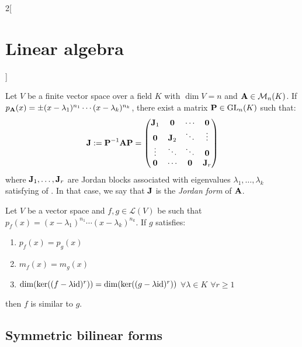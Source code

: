\documentclass[../../../main_math.tex]{subfiles}
\begin{document}
\begin{multicols}{2}[\section{Linear algebra}]
\begin{proposition}
\begin{enumerate}
    \end{enumerate}
  \end{proposition}
  \begin{proposition}
    Let $V$ be a finite vector space over a field $K$ with $\dim V=n$ and $\boldsymbol{\mathrm{A}}\in\mathcal{M}_n(K)$. If $p_{\boldsymbol{\mathrm{A}}}(x)=\pm(x-\lambda_1)^{n_1}\cdots(x-\lambda_k)^{n_k}$, there exist a matrix $\boldsymbol{\mathrm{P}}\in\mathrm{GL}_n(K)$ such that:
    $$\boldsymbol{\mathrm{J}}:=\boldsymbol{\mathrm{P}}^{-1}\boldsymbol{\mathrm{A}}\boldsymbol{\mathrm{P}}=
      \begin{pmatrix}
        \boldsymbol{\mathrm{J}}_1 & \boldsymbol{\mathrm{0}}   & \cdots & \boldsymbol{\mathrm{0}}   \\
        \boldsymbol{\mathrm{0}}   & \boldsymbol{\mathrm{J}}_2 & \ddots & \vdots   \\
        \vdots   & \ddots   & \ddots & \boldsymbol{\mathrm{0}}   \\
        \boldsymbol{\mathrm{0}}   & \cdots   & \boldsymbol{\mathrm{0}} & \boldsymbol{\mathrm{J}}_r \\
      \end{pmatrix}
    $$
    where $\boldsymbol{\mathrm{J}}_1,\ldots,\boldsymbol{\mathrm{J}}_r$ are Jordan blocks associated with eigenvalues $\lambda_1,\ldots,\lambda_k$ satisfying  of . In that case, we say that $\boldsymbol{\mathrm{J}}$ is the \emph{Jordan form} of $\boldsymbol{\mathrm{A}}$.
  \end{proposition}
  \begin{theorem}
    Let $V$ be a vector space and $f,g\in\mathcal{L}(V)$ be such that $p_f(x)=(x-\lambda_1)^{n_1}\cdots(x-\lambda_k)^{n_k}$. If $g$ satisfies:
    \begin{enumerate}
      \item $p_f(x)=p_g(x)$
      \item $m_f(x)=m_g(x)$
      \item $\dim(\ker((f-\lambda \mathrm{id})^r))=\dim(\ker((g-\lambda \mathrm{id})^r))$ $\forall\lambda\in K$ $\forall r\geq 1$
    \end{enumerate}
    then $f$ is similar to $g$.
  \end{theorem}
  \subsection{Symmetric bilinear forms}

\end{multicols}
\end{document}

